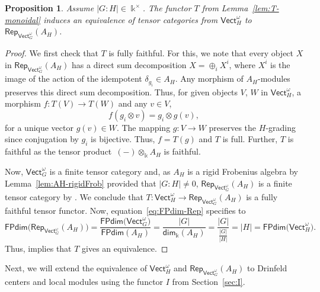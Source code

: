 \documentclass[10pt,a4paper]{amsart}
\numberwithin{equation}{section}
\newtheorem{Proposition}[Theorem]{Proposition}
 { \theoremstyle{definition}
\newtheorem{Definition}[Theorem]{Definition}
\newtheorem{Note}[Theorem]{Note}
\newtheorem{Notation}[Theorem]{Notation}
\newtheorem{Example}[Theorem]{Example}
\newtheorem{Remark}[Theorem]{Remark} }
\newcommand{\FPdim}{\mathsf{FPdim}}
\renewcommand{\dim}{\mathsf{dim}}
\newcommand{\Rep}{\mathsf{Rep}}
\newcommand{\Vect}{\mathsf{Vect}}
\newcommand{\rI}{I}
\begin{document}
\begin{Proposition}\label{prop:RepAH-equiv}
Assume $|G:H|\in \Bbbk^\times$. The functor $T$ from Lemma~{\rm \ref{lem:T-monoidal}} induces an equivalence of tensor categories from $\Vect_H^\omega$ to $\Rep_{\Vect_G^\omega}(A_H)$.
\end{Proposition}
\begin{proof}
We first check that $T$ is fully faithful. For this, we note that every object $X$ in $\Rep_{\Vect_G^\omega}(A_H)$ has a direct sum decomposition
$X=\oplus_iX^i$, where $X^i$ is the image of the action of the idempotent $\delta_{g_i}\in A_H$. Any morphism of $A_H$-modules preserves this direct sum decomposition. Thus, for given objects $V$, $W$ in $\Vect_H^\omega$, a morphism $f\colon T(V)\to T(W)$ and any $v\in V$,
\[f(g_i\otimes v)=g_i\otimes g(v),\]
for a unique vector $g(v)\in W$. The mapping $g\colon V\to W$ preserves the $H$-grading since conjugation by $g_i$ is bijective. Thus, $f=T(g)$ and $T$ is full. Further, $T$ is faithful as the tensor product~${(-)\otimes_\Bbbk A_H}$ is faithful.

Now, $\Vect_G^\omega$ is a finite tensor category and, as $A_H$ is a rigid Frobenius algebra by Lemma~\ref{lem:AH-rigidFrob} provided that $|G:H|\neq 0$, $\Rep_{\Vect_G^\omega}(A_H)$ is a finite tensor category by \cite[Corollary 4.21]{LW3}. We conclude that $T\colon \Vect_H^\omega\to \Rep_{\Vect_G^\omega}(A_H)$ is a fully faithful tensor functor. Now, equation~\eqref{eq:FPdim-Rep} specifies to
\[\FPdim\big(\Rep_{\Vect_G^\omega}(A_H)\big)=\frac{\FPdim\big(\Vect_G^\omega\big)}{\FPdim(A_H)}=\frac{|G|}{\dim_\Bbbk(A_H)}=\frac{|G|}{\frac{|G|}{|H|}}=|H|=\FPdim\big(\Vect_H^\omega\big).\]
Thus, \cite[Proposition~6.3.3]{EGNO} implies that $T$ gives an equivalence.
\end{proof}

Next, we will extend the equivalence of $\Vect_H^\omega$ and $\Rep_{\Vect_G^\omega}(A_H)$ to Drinfeld centers and local modules using the functor $\rI$ from Section~\ref{sec:I}.
\end{document}
